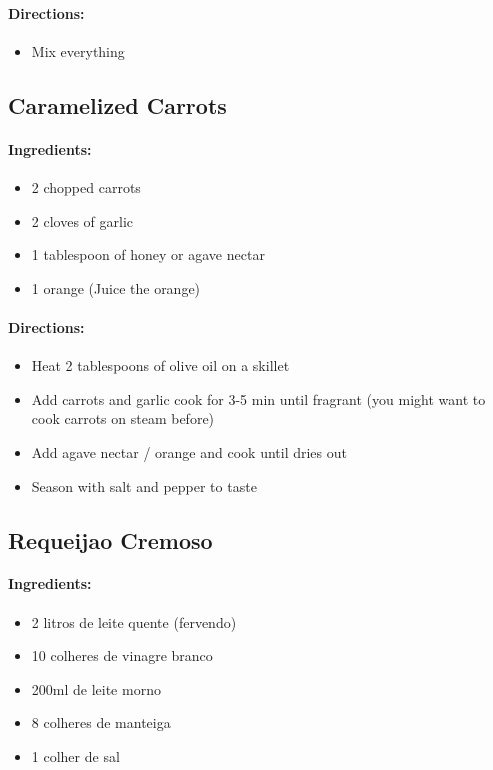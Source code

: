 \documentclass{article}
\begin{document}
\paragraph{Directions:}
\begin{itemize}
	\item Mix everything
\end{itemize}

\subsection{Caramelized Carrots}

\paragraph{Ingredients:}

\begin{itemize}
	\item 2 chopped carrots
	\item 2 cloves of garlic
	\item 1 tablespoon of honey or agave nectar
	\item 1 orange (Juice the orange)
\end{itemize}

\paragraph{Directions:}
\begin{itemize}
	\item  Heat 2 tablespoons of olive oil on a skillet
	\item Add carrots and garlic cook for 3-5 min until fragrant (you might want to cook carrots on steam before)
	\item Add agave nectar / orange and cook until dries out
	\item Season with salt and pepper to taste
\end{itemize}

\subsection{Requeijao Cremoso}

\paragraph{Ingredients:}

\begin{itemize}
	\item 2 litros de leite quente (fervendo)
	\item 10 colheres de vinagre branco
	\item 200ml de leite morno
	\item 8 colheres de manteiga
	\item 1 colher de sal
\end{itemize}
\end{document}
